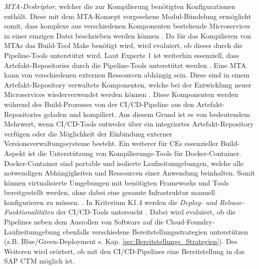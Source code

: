\textit{MTA-Deskriptor}, welcher die zur Kompilierung benötigten Konfigurationen enthält. Diese mit dem MTA-Konzept vorgesehene Modul-Bündelung ermöglicht somit, dass komplexe aus verschiedenen Komponenten bestehende Microservices in einer einzigen Datei beschrieben werden können \cite{.20230405b}. Da für das Kompilieren von MTAs das Build-Tool Make benötigt wird, wird evaluiert, ob dieses durch die Pipeline-Tools unterstützt wird. Laut Experte 1 ist weiterhin essenziell, dass Artefakt-Repositories durch die Pipeline-Tools unterstützt werden \cite[Z. 15 ff.]{ProductOwnerSAPBTPProd&Infra.}. Eine MTA kann von verschiedenen externen Ressourcen abhängig sein. Diese sind in einem Artefakt-Repository verwaltete Komponenten, welche bei der Entwicklung neuer Microservices wiederverwendet werden können \cite[Z. 40 ff.]{ProductOwnerSAPBTPProd&Infra.}. Diese Komponenten werden während des Build-Prozesses von der CI/CD-Pipeline aus den Artefakt-Repositories geladen und kompiliert. Aus diesem Grund ist es von bedeutendem Mehrwert, wenn CI/CD-Tools entweder über ein integriertes Artefakt-Repository verfügen oder die Möglichkeit der Einbindung externer Versionsverwaltungssysteme besteht. Ein weiterer für CEs essenzieller Build-Aspekt ist die Unterstützung von Kompilierungs-Tools für Docker-Container. Docker-Container sind portable und isolierte Laufzeitumgebungen, welche alle notwendigen Abhängigkeiten und Ressourcen einer Anwendung beinhalten. Somit können virtualisierte Umgebungen mit benötigten Frameworks und Tools bereitgestellt werden, ohne dabei eine gesamte Infrastruktur manuell konfigurieren zu müssen. \cite{Arora.20200504}. In Kriterium K1.4 werden die \textit{Deploy- und Release-Funktionalitäten} der CI/CD-Tools untersucht \cite[Z. 73 ff.]{ProductOwnerSAPBTPProd&Infra.}. Dabei wird evaluiert, ob die Pipelines neben dem Ausrollen von Software auf die Cloud-Foundry-Laufzeitumgebung ebenfalls verschiedene Bereitstellungsstrategien unterstützen (z.B. Blue/Green-Deployment s. Kap. \ref{sec:Bereitstellungs_Strategien}). Des Weiteren wird erörtert, ob mit den CI/CD-Pipelines eine Bereitstellung in das \ac{SAP CTM} möglich ist.
